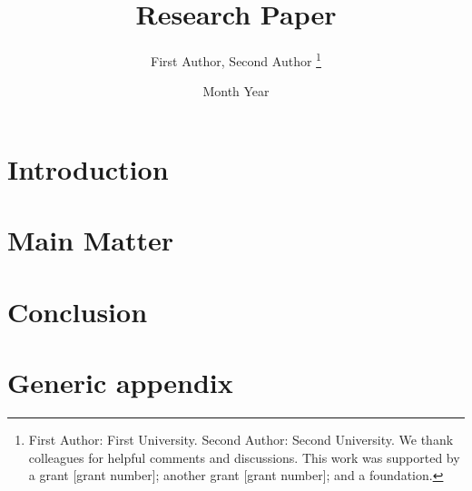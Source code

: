 \documentclass[letterpaper,11pt,leqno]{article}
\newcommand{\bib}{paper.bib}
\begin{document}
\title{Research Paper}

\author{First Author, Second Author
%
\thanks{First Author: First University. Second Author: Second University. We thank colleagues for helpful comments and discussions. This work was supported by a grant [grant number]; another grant [grant number]; and a foundation.}}

\date{Month Year}   


\begin{titlepage}
\maketitle



\end{titlepage}

\section{Introduction}\label{s:introduction}


\section{Main Matter}\label{s:section}



\section{Conclusion}\label{s:ccl}



\appendix

\section{Generic appendix}\label{a:appendix1}
\end{document}
